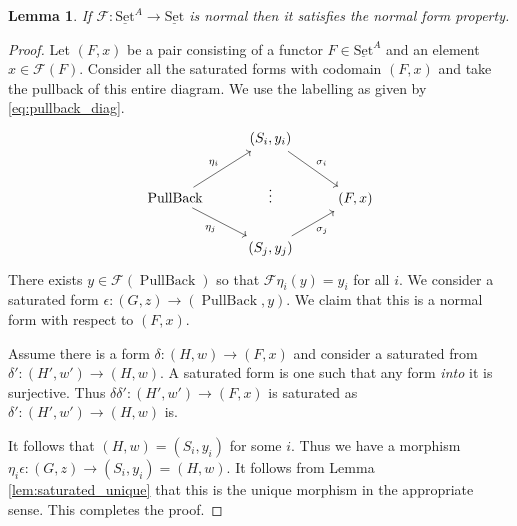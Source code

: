 \documentclass[12pt]{article}
\theoremstyle{plain}
\newtheorem{lemma}[thm]{Lemma}
\theoremstyle{definition}
\newcommand{\scr}[1]{\mathscr{#1}}
\newcommand{\lto}{\longrightarrow}
\newcommand{\set}{\operatorname{\underline{Set}}}
\begin{document}
	\begin{lemma}\label{lem:normal--->finite_normal_form_property}
		If $\scr{F}: \set^A \lto \set$ is normal then it satisfies the normal form property.
		\end{lemma}
	\begin{proof}
		Let $(F,x)$ be a pair consisting of a functor $F \in \set^A$ and an element $x \in \scr{F}(F)$. Consider all the saturated forms with codomain $(F,x)$ and take the pullback of this entire diagram. We use the labelling as given by \eqref{eq:pullback_diag}.
		\begin{equation}\label{eq:pullback_diag}
			\begin{tikzcd}
				& (S_i, y_i)\arrow[dr,"{\sigma_i}"]\\
				\operatorname{PullBack}\arrow[ur,"{\eta_i}"]\arrow[dr,swap,"{\eta_j}"] & \vdots & (F,x)\\
				 & (S_j, y_j)\arrow[ur,swap,"{\sigma_j}"]
				\end{tikzcd}
			\end{equation}
		There exists $y \in \scr{F}(\operatorname{PullBack})$ so that $\scr{F}\eta_i(y) = y_i$ for all $i$. We consider a saturated form $\epsilon: (G, z) \lto (\operatorname{PullBack}, y)$. We claim that this is a normal form with respect to $(F,x)$.
		
		Assume there is a form $\delta: (H, w) \lto (F,x)$ and consider a saturated from $\delta': (H', w') \lto (H, w)$. A saturated form is one such that any form \emph{into} it is surjective. Thus $\delta \delta': (H', w')\lto (F,x)$ is saturated as $\delta': (H', w') \lto (H,w)$ is.
		
		It follows that $(H,w) = (S_i, y_i)$ for some $i$. Thus we have a morphism $\eta_i \epsilon: (G, z) \lto (S_i, y_i) = (H,w)$. It follows from Lemma \ref{lem:saturated_unique} that this is the unique morphism in the appropriate sense. This completes the proof.
		\end{proof}
	
\end{document}

